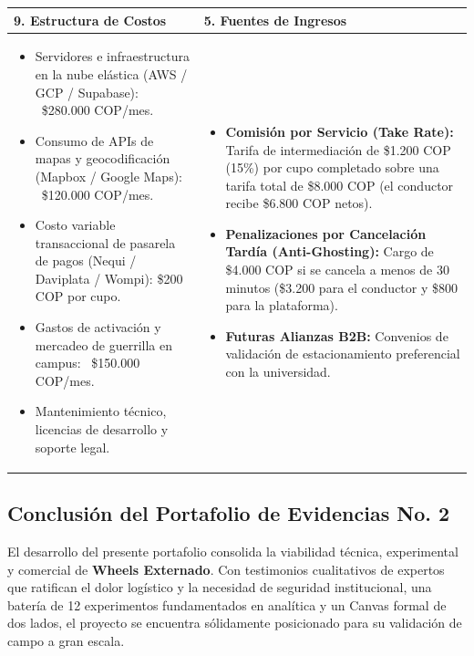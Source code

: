 \documentclass[11pt,a4paper]{article}
\begin{document}
\begin{table}[h!]
\centering
\scriptsize
\begin{tabularx}{\linewidth}{|X|X|}
\hline
\rowcolor{primary!15}
\textbf{9. Estructura de Costos} & 
\textbf{5. Fuentes de Ingresos} \\
\hline
\begin{itemize}[leftmargin=*]
    \item Servidores e infraestructura en la nube elástica (AWS / GCP / Supabase): ~\$280.000 COP/mes.
    \item Consumo de APIs de mapas y geocodificación (Mapbox / Google Maps): ~\$120.000 COP/mes.
    \item Costo variable transaccional de pasarela de pagos (Nequi / Daviplata / Wompi): \$200 COP por cupo.
    \item Gastos de activación y mercadeo de guerrilla en campus: ~\$150.000 COP/mes.
    \item Mantenimiento técnico, licencias de desarrollo y soporte legal.
\end{itemize} & 
\begin{itemize}[leftmargin=*]
    \item \textbf{Comisión por Servicio (Take Rate):} Tarifa de intermediación de \$1.200 COP (15\%) por cupo completado sobre una tarifa total de \$8.000 COP (el conductor recibe \$6.800 COP netos).
    \item \textbf{Penalizaciones por Cancelación Tardía (Anti-Ghosting):} Cargo de \$4.000 COP si se cancela a menos de 30 minutos (\$3.200 para el conductor y \$800 para la plataforma).
    \item \textbf{Futuras Alianzas B2B:} Convenios de validación de estacionamiento preferencial con la universidad.
\end{itemize} \\
\hline
\end{tabularx}
\end{table}

\subsection{Conclusión del Portafolio de Evidencias No. 2}
El desarrollo del presente portafolio consolida la viabilidad técnica, experimental y comercial de \textbf{Wheels Externado}. Con testimonios cualitativos de expertos que ratifican el dolor logístico y la necesidad de seguridad institucional, una batería de 12 experimentos fundamentados en analítica y un Canvas formal de dos lados, el proyecto se encuentra sólidamente posicionado para su validación de campo a gran escala.
\end{document}
